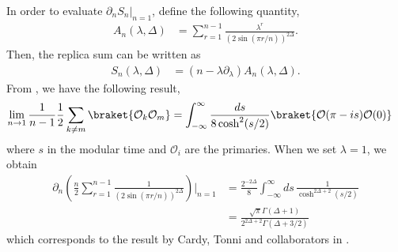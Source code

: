 \documentclass[11pt]{article}
\newcommand{\p}{\partial}
\newcommand{\mO}{\mathcal{O}}
\newcommand{\lb}{\left(}
\newcommand{\rb}{\right)}
\begin{document}
In order to evaluate $\p_n {S}_n |_{n=1}$, define the following quantity,
\begin{align}
    A_{n}(\lambda,\Delta) &= \sum_{r=1}^{n-1}\frac{\lambda^r}{\lb2\sin(\pi r/n)\rb^{2\Delta}}.
\end{align}
Then, the replica sum can be written as
\begin{align}
    {S}_n(\lambda,\Delta) &= (n-\lambda \p _\lambda)A_{n}(\lambda,\Delta).
\end{align}
From \cite{S_rosi_2018}, we have the following result,
\begin{align}
    \lim_{n\to 1}\frac{1}{n-1}\frac{1}{2}\sum_{k\neq m} \braket{\mO _k \mO_m} &= \int_{-\infty}^\infty \frac{ds}{8\cosh^2 (s/2)} \braket{\mO(\pi - is) \mO(0)}
\end{align}
where $s$ in the modular time and $\mO_i$ are the primaries.
When we set $\lambda =1$, we obtain
\begin{align}
    \p_n \lb \frac{n}{2} \sum_{r=1}^{n-1}\frac{1}{\lb 2\sin(\pi r/n) \rb^{2\Delta}}\rb\Bigg|_{n=1}
    &=\frac{2^{-2\Delta}}{8} \int_{-\infty}^\infty ds\, \frac{1}{\cosh^{2\Delta +2}(s/2)} \\
    &= \frac{\sqrt \pi \Gamma(\Delta +1)}{2^{2\Delta +2} \Gamma(\Delta  + 3/2)}
\end{align} 
which corresponds to the result by Cardy, Tonni and collaborators in \cite{calabrese2011entanglement}.
\end{document}

